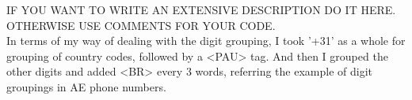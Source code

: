 \documentclass{../labbook}
\begin{document}
\begin{solution}
IF YOU WANT TO WRITE AN EXTENSIVE DESCRIPTION DO IT HERE. OTHERWISE USE COMMENTS FOR YOUR CODE.\\
In terms of my way of dealing with the digit grouping, I took '+31' as a whole for grouping of country codes, followed by a <PAU> tag. And then I grouped the other digits and added <BR> every 3 words, referring the example of digit groupings in AE phone numbers. 
\end{solution}
\end{document}
